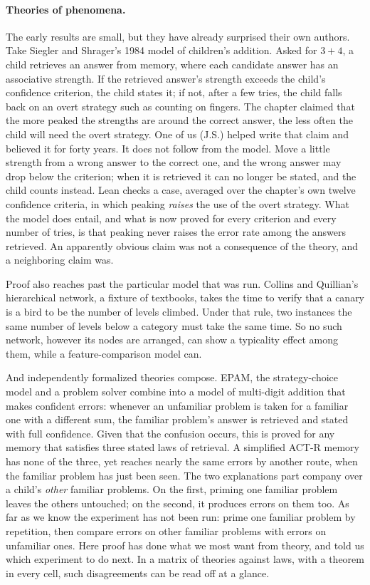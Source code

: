 \documentclass[11pt]{article}
\begin{document}
\paragraph{Theories of phenomena.}
The early results are small, but they have already surprised their own
authors. Take Siegler and Shrager's 1984 model of children's
addition\cite{siegler1984}. Asked for $3+4$, a child retrieves an
answer from memory, where each candidate answer has an associative
strength. If the retrieved answer's strength exceeds the child's
confidence criterion, the child states it; if not, after a few tries,
the child falls back on an overt strategy such as counting on fingers.
The chapter claimed that the more peaked the strengths are around the
correct answer, the less often the child will need the overt strategy.
One of us (J.S.) helped write that claim and believed it for forty
years. It does not follow from the model. Move a little strength from a
wrong answer to the correct one, and the wrong answer may drop below
the criterion; when it is retrieved it can no longer be stated, and the
child counts instead. Lean checks a case, averaged over the chapter's
own twelve confidence criteria, in which peaking \emph{raises} the use
of the overt strategy. What the model does entail, and what is now
proved for every criterion and every number of tries, is that peaking
never raises the error rate among the answers retrieved. An apparently
obvious claim was not a consequence of the theory, and a neighboring
claim was.

Proof also reaches past the particular model that was run. Collins and
Quillian's hierarchical network\cite{collins1969}, a fixture of
textbooks, takes the time to verify that a canary is a bird to be the
number of levels climbed. Under that rule, two instances the same
number of levels below a category must take the same time. So no such
network, however its nodes are arranged, can show a typicality effect
among them, while a feature-comparison model can.

And independently formalized theories compose. EPAM\cite{feigenbaum1962},
the strategy-choice model and a problem solver combine into a model of
multi-digit addition that makes confident errors: whenever an
unfamiliar problem is taken for a familiar one with a different sum,
the familiar problem's answer is retrieved and stated with full
confidence. Given that the confusion occurs, this is proved for any
memory that satisfies three stated laws of retrieval. A simplified
ACT-R memory has none of the three, yet reaches nearly the same errors
by another route, when the familiar problem has just been seen. The two
explanations part company over a child's \emph{other} familiar
problems. On the first, priming one familiar problem leaves the others
untouched; on the second, it produces errors on them too. As far as we
know the experiment has not been run: prime one familiar problem by
repetition, then compare errors on other familiar problems with errors
on unfamiliar ones. Here proof has done what we most want from theory,
and told us which experiment to do next. In a matrix of theories
against laws, with a theorem in every cell, such disagreements can be
read off at a glance.
\end{document}
